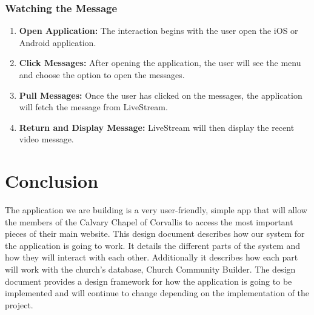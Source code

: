 \documentclass[letterpaper,10pt,draftclsnofoot,onecolumn,titlepage]{IEEEtran}
\begin{document}
			\subsubsection{Watching the Message}
				\begin{enumerate}
					\item \textbf{Open Application:} The interaction begins with the user open the iOS or Android application.
					\item \textbf{Click Messages:} After opening the application, the user will see the menu and choose the option to open the messages.
					\item \textbf{Pull Messages:} Once the user has clicked on the messages, the application will fetch the message from LiveStream.
					\item \textbf{Return and Display Message:} LiveStream will then display the recent video message.
				\end{enumerate}




	\section{Conclusion}
		The application we are building is a very user-friendly, simple app that will allow the members of the Calvary Chapel of Corvallis to access the most important pieces of their main website. 
		This design document describes how our system for the application is going to work. 
		It details the different parts of the system and how they will interact with each other. 
		Additionally it describes how each part will work with the church's database, Church Community Builder. 
		The design document provides a design framework for how the application is going to be implemented and will continue to change depending on the implementation of the project. 
		
	
		
\end{document}
